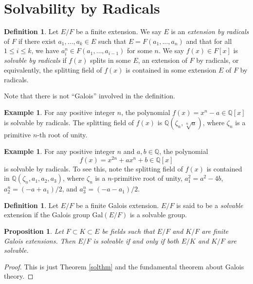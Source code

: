 \documentclass[12pt]{report}
\newtheorem{proposition}[theorem]{Proposition}
{\theoremstyle{remark}\newtheorem*{remark}{Remark}}
\theoremstyle{definition}
\newtheorem{definition}[theorem]{Definition}
\newtheorem{example}[theorem]{Example}
\newcommand{\gal}{\text{Gal}}
\newcommand{\qq}{\mathbb{Q}}
\begin{document}
\section{Solvability by Radicals}

\begin{definition}
	Let $E/F$ be a finite extension. We say $E$ is an \emph{extension by radicals} of $F$ if there exist $a_1,\dots,a_k\in E$ such that $E=F(a_1,\dots,a_n)$ and that for all $1\leq i\leq k$, we have $a_i^n\in F(a_1,\dots,a_{i-1})$ for some $n$. We say $f(x)\in F[x]$ is \emph{solvable by radicals} if $f(x)$ splits in some $E$, an extension of $F$ by radicals, or equivalently, the splitting field of $f(x)$ is contained in some extension $E$ of $F$ by radicals.
\end{definition}

Note that there is not ``Galois'' involved in the definition.

\begin{example}
	For any positive integer $n$, the polynomial $f(x)=x^n-a\in \qq[x]$ is solvable by radicals. The splitting field of $f(x)$ is $\qq(\zeta_n, \sqrt[n]{a})$, where $\zeta_n$ is a primitive $n$-th root of unity.
\end{example}

\begin{example}
	For any positive integer $n$ and $a,b\in \qq$, the polynomial $$f(x)=x^{2n}+ax^n+b\in \qq[x]$$ is solvable by radicals. To see this, note the splitting field of $f(x)$ is contained in $\qq(\zeta_n,a_1,a_2,a_3)$, where $\zeta_n$ is a $n$-primitive root of unity, $a_1^2=a^2-4b$, $a_2^n=(-a+a_1)/2$, and $a_3^n=(-a-a_1)/2$.
\end{example}

\begin{definition}
	Let $E/F$ be a finite Galois extension. $E/F$ is said to be a \emph{solvable} extension if the Galois group $\gal(E/F)$ is a solvable group.
\end{definition}

\begin{proposition}\label{subsol}
	Let $F\subset K\subset E$ be fields such that $E/F$ and $K/F$ are finite Galois extensions. Then $E/F$ is solvable if and only if both $E/K$ and $K/F$ are solvable.
\end{proposition}

\begin{proof}
	This is just Theorem \ref{solthm} and the fundamental theorem about Galois theory.
\end{proof}
\end{document}
